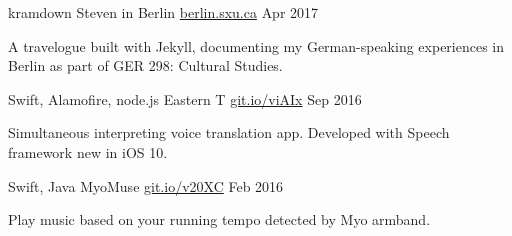 \begin{cventries}
        \cventry
        {kramdown}
        {Steven in Berlin}
        {\href{https://berlin.sxu.ca}{berlin.sxu.ca}}
        {Apr 2017}
        {
            \begin{cvitems}
                \item {A travelogue built with Jekyll, documenting my German-speaking experiences in Berlin as part of GER 298: Cultural Studies.}
            \end{cvitems}
        }
    \cventry
        {Swift, Alamofire, node.js}
        {Eastern T}
        {\href{https://git.io/viAIx}{git.io/viAIx}}
        {Sep 2016}
        {
            \begin{cvitems}
                \item {Simultaneous interpreting voice translation app. Developed with Speech framework new in iOS 10.}
            \end{cvitems}
        }
    \cventry
        {Swift, Java}
        {MyoMuse}
        {\href{https://git.io/v20XC}{git.io/v20XC}}
        {Feb 2016}
        {
            \begin{cvitems}
                \item {Play music based on your running tempo detected by Myo armband.}
            \end{cvitems}
        }
\end{cventries}
